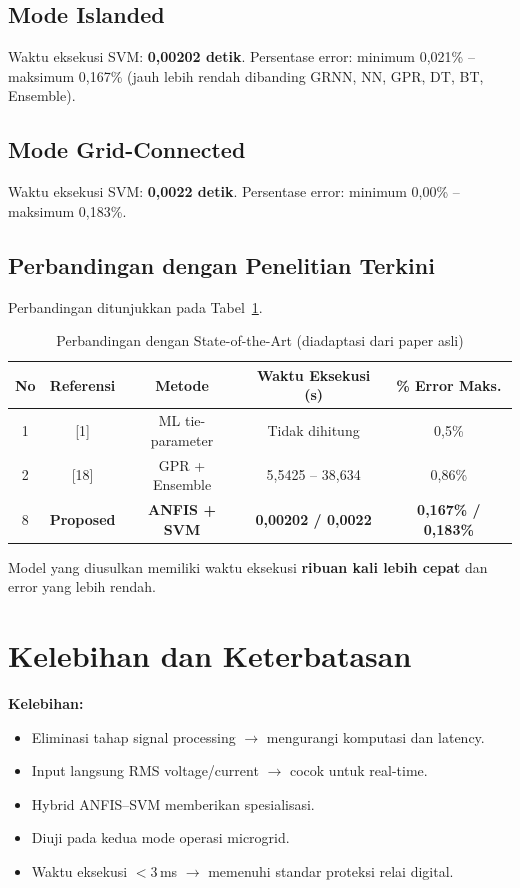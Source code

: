 \documentclass{article}
\begin{document}
\subsection{Mode Islanded}
Waktu eksekusi SVM: \textbf{0,00202 detik}. Persentase error: minimum 0,021\% -- maksimum 0,167\% (jauh lebih rendah dibanding GRNN, NN, GPR, DT, BT, Ensemble).

\subsection{Mode Grid-Connected}
Waktu eksekusi SVM: \textbf{0,0022 detik}. Persentase error: minimum 0,00\% -- maksimum 0,183\%.

\subsection{Perbandingan dengan Penelitian Terkini}
Perbandingan ditunjukkan pada Tabel~\ref{tab:comparison}.

\begin{table}[htbp]
\centering
\caption{Perbandingan dengan State-of-the-Art (diadaptasi dari paper asli)}
\label{tab:comparison}
\begin{tabular}{@{}ccccc@{}}
\toprule
\textbf{No} & \textbf{Referensi} & \textbf{Metode} & \textbf{Waktu Eksekusi (s)} & \textbf{\% Error Maks.} \\
\midrule
1 & [1]  & ML tie-parameter & Tidak dihitung & 0,5\% \\
2 & [18] & GPR + Ensemble   & 5,5425 -- 38,634 & 0,86\% \\
8 & \textbf{Proposed} & \textbf{ANFIS + SVM} & \textbf{0,00202 / 0,0022} & \textbf{0,167\% / 0,183\%} \\
\bottomrule
\end{tabular}
\end{table}

Model yang diusulkan memiliki waktu eksekusi \textbf{ribuan kali lebih cepat} dan error yang lebih rendah.

\section{Kelebihan dan Keterbatasan}

\textbf{Kelebihan:}
\begin{itemize}
    \item Eliminasi tahap signal processing $\rightarrow$ mengurangi komputasi dan latency.
    \item Input langsung RMS voltage/current $\rightarrow$ cocok untuk real-time.
    \item Hybrid ANFIS--SVM memberikan spesialisasi.
    \item Diuji pada kedua mode operasi microgrid.
    \item Waktu eksekusi $< 3$\,ms $\rightarrow$ memenuhi standar proteksi relai digital.
\end{itemize}
\end{document}
